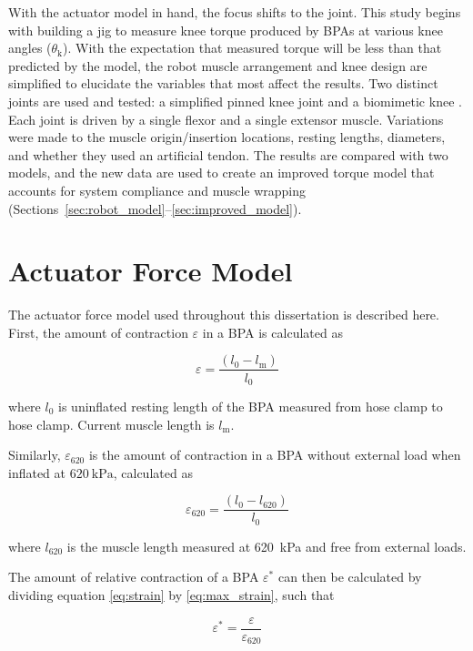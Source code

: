 With the actuator model in hand, the focus shifts to the joint. This study begins with building a jig to measure knee torque produced by BPAs at various knee angles ($\theta_\text{k}$). With the expectation that measured torque will be less than that predicted by the model, the robot muscle arrangement and knee design are simplified to elucidate the variables that most affect the results. Two distinct joints are used and tested: a simplified pinned knee joint and a biomimetic knee \citep{steele_biomimetic_2018}. Each joint is driven by a single flexor and a single extensor muscle. Variations were made to the muscle origin/insertion locations, resting lengths, diameters, and whether they used an artificial tendon. The results are compared with two models, and the new data are used to create an improved torque model that accounts for system compliance and muscle wrapping (Sections~\ref{sec:robot_model}--\ref{sec:improved_model}).

\section{Actuator Force Model}\label{sec:force_model}


The actuator force model used throughout this dissertation is described here. First, the amount of contraction ${\varepsilon}$ in a BPA is calculated as

\begin{equation}
    {\varepsilon} = \frac{(l_{0}-l_\text{m})}{l_{0}} \label{eq:strain}
\end{equation}

where $l_{0}$ is uninflated resting length of the BPA measured from hose clamp to hose clamp. Current muscle length is $l_\text{m}$.

Similarly, ${\varepsilon_{620}}$ is the amount of contraction in a BPA without external load when inflated at $\qty{620}{\kPa}$, calculated as 

\begin{equation}
    \varepsilon_{620} = \frac{(l_{0}-l_{620})}{l_{0}} \label{eq:max_strain}
\end{equation}

where $l_{620}$ is the muscle length measured at \qty{620}{\kPa} and free from external loads. 

The amount of relative contraction of a BPA $\varepsilon^*$ can then be calculated by dividing equation \eqref{eq:strain} by \eqref{eq:max_strain}, such that

\begin{equation}
    \varepsilon^* = \frac{\varepsilon}{\varepsilon_{620}} \label{eq:rel_strain}
\end{equation}

